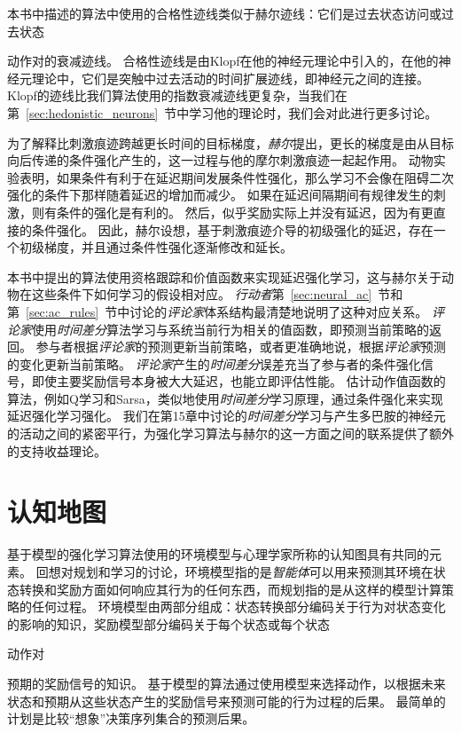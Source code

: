 本书中描述的算法中使用的合格性迹线类似于赫尔迹线：它们是过去状态访问或过去状态{动作对的衰减迹线。
合格性迹线是由Klopf\cite{klopf1972brain}在他的神经元理论中引入的，在他的神经元理论中，它们是突触中过去活动的时间扩展迹线，即神经元之间的连接。
Klopf的迹线比我们算法使用的指数衰减迹线更复杂，当我们在第~\ref{sec:hedonistic_neurons}~节中学习他的理论时，我们会对此进行更多讨论。


为了解释比刺激痕迹跨越更长时间的目标梯度，\textit{赫尔}\cite{hull1943principles}提出，更长的梯度是由从目标向后传递的条件强化产生的，这一过程与他的摩尔刺激痕迹一起起作用。
动物实验表明，如果条件有利于在延迟期间发展条件性强化，那么学习不会像在阻碍二次强化的条件下那样随着延迟的增加而减少。
如果在延迟间隔期间有规律发生的刺激，则有条件的强化是有利的。
然后，似乎奖励实际上并没有延迟，因为有更直接的条件强化。
因此，赫尔设想，基于刺激痕迹介导的初级强化的延迟，存在一个初级梯度，并且通过条件性强化逐渐修改和延长。


本书中提出的算法使用资格跟踪和价值函数来实现延迟强化学习，这与赫尔关于动物在这些条件下如何学习的假设相对应。
\textit{行动者}第~\ref{sec:neural_ac}~节和第~\ref{sec:ac_rules}~节中讨论的\textit{评论家}体系结构最清楚地说明了这种对应关系。
\textit{评论家}使用\textit{时间差分}算法学习与系统当前行为相关的值函数，即预测当前策略的返回。
参与者根据\textit{评论家}的预测更新当前策略，或者更准确地说，根据\textit{评论家}预测的变化更新当前策略。
\textit{评论家}产生的\textit{时间差分}误差充当了参与者的条件强化信号，即使主要奖励信号本身被大大延迟，也能立即评估性能。
估计动作值函数的算法，例如Q学习和Sarsa，类似地使用\textit{时间差分}学习原理，通过条件强化来实现延迟强化学习强化。
我们在第15章中讨论的\textit{时间差分}学习与产生多巴胺的神经元的活动之间的紧密平行，为强化学习算法与赫尔的这一方面之间的联系提供了额外的支持收益理论。


\section{认知地图} \label{sec:cognitive_maps}

基于模型的强化学习算法使用的环境模型与心理学家所称的认知图具有共同的元素。
回想对规划和学习的讨论，环境模型指的是\textit{智能体}可以用来预测其环境在状态转换和奖励方面如何响应其行为的任何东西，而规划指的是从这样的模型计算策略的任何过程。
环境模型由两部分组成：状态转换部分编码关于行为对状态变化的影响的知识，奖励模型部分编码关于每个状态或每个状态{动作对{预期的奖励信号的知识。
基于模型的算法通过使用模型来选择动作，以根据未来状态和预期从这些状态产生的奖励信号来预测可能的行为过程的后果。
最简单的计划是比较“想象”决策序列集合的预测后果。


}}}
